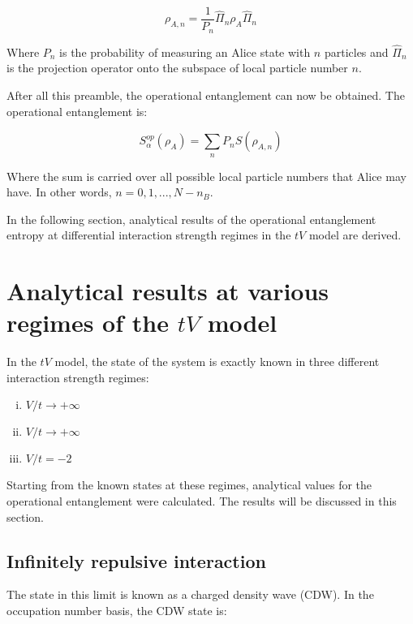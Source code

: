 \begin{equation}
\rho_{A,n} = \frac{1}{P_n} \hat{\Pi}_n \rho_A \hat{\Pi}_n
\end{equation}

Where $P_n$ is the probability of measuring an Alice state with $n$ particles and $\hat{\Pi}_{n}$ is the projection operator onto the subspace of local particle number $n$.

After all this preamble, the operational entanglement can now be obtained. The operational entanglement is:

\begin{equation}
S_{\alpha}^{op}(\rho_A) = \sum_{n} P_n S(\rho_{A,n}) 
\end{equation}

Where the sum is carried over all possible local particle numbers that Alice may have. In other words, $n=0,1,...,N-n_{B}$.

In the following section, analytical results of the operational entanglement entropy at differential interaction strength regimes in the $tV$ model are derived.


\section{Analytical results at various regimes of the $tV$ model}
	In the $tV$ model, the state of the system is exactly known in three different interaction strength regimes:
	
	\begin{enumerate} [i)]
		
		\item$V/t \to +\infty $
		\item $V/t \to +\infty $
		\item $V/t = -2$
	\end{enumerate}
	
	Starting from the known states at these regimes, analytical values for the operational entanglement were calculated. The results will be discussed in this section.

	\subsection{Infinitely repulsive interaction}
		The state in this limit is known as a charged density wave (CDW). In the occupation number basis, the CDW state is:

